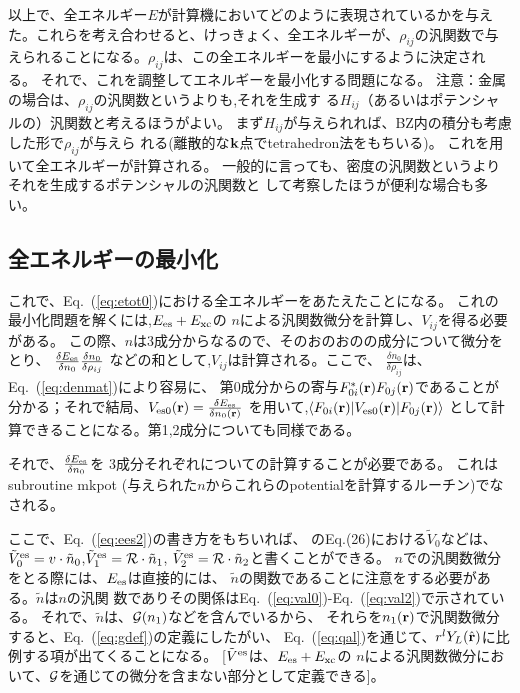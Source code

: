 \documentclass[a4paper,10pt,aip,onecolumn,amsmath,amssymb,floatfix,rmp]{revtex4-1}
\newcommand{\bfk}{{\bf k}}
\newcommand{\bfr}{{\bf r}}
\newcommand{\req}[1]{\mbox{Eq.~\!(\ref{#1})}}
\def\tn{\tilde{n}}
\def\tV{\tilde{V}}
\begin{document}
以上で、全エネルギー$E$が計算機においてどのように表現されているかを与え
た。これらを考え合わせると、けっきょく、全エネルギーが、$\rho_{ij}$の汎関数で与
えられることになる。$\rho_{ij}$は、この全エネルギーを最小にするように決定される。
それで、これを調整してエネルギーを最小化する問題になる。
{\small 注意：金属の場合は、$\rho_{ij}$の汎関数というよりも,それを生成す
る$H_{ij}$（あるいはポテンシャルの）汎関数と考えるほうがよい。
まず$H_{ij}$が与えられれば、BZ内の積分も考慮した形で$\rho_{ij}$が与えら
れる(離散的な$\bfk$点でtetrahedron法をもちいる)。
これを用いて全エネルギーが計算される。
一般的に言っても、密度の汎関数というよりそれを生成するポテンシャルの汎関数と
して考察したほうが便利な場合も多い。}

\subsection{全エネルギーの最小化}
これで、\req{eq:etot0}における全エネルギーをあたえたことになる。
これの最小化問題を解くには,$E_{\rm es} + E_{\rm xc}$の
$n$による汎関数微分を計算し、$V_{ij}$を得る必要がある。
この際、$n$は3成分からなるので、そのおのおのの成分について微分をとり、
$\frac{\delta E_{\rm es}}{\delta n_0} \frac{\delta n_0}{\delta\rho_{ij}}$
などの和として,$V_{ij}$は計算される。ここで、
$\frac{\delta n_0}{\delta \rho_{ij}}$は、\req{eq:denmat}により容易に、
第0成分からの寄与$F_{0i}^*(\bfr) F_{0j}(\bfr)$であることが
分かる；それで結局、$V_{\rm es0}(\bfr)=\frac{\delta E_{\rm es}}{\delta n_0(\bfr)}$
を用いて,$\langle F_{0i}(\bfr)|V_{\rm es0}(\bfr)| F_{0j}(\bfr)\rangle$
として計算できることになる。第1,2成分についても同様である。

それで、$\frac{\delta E_{\rm es}}{\delta n_0}$を
3成分それぞれについての計算することが必要である。
これはsubroutine mkpot
(与えられた$n$からこれらのpotentialを計算するルーチン)でなされる。

ここで、\req{eq:ees2}の書き方をもちいれば、
\cite{lmfchap}のEq.(26)における$\tV_0$などは、
$\tV^{\rm es}_0= v\cdot \tn_0$,$\tV^{\rm es}_1= {\cal R} \cdot\tn_1$,
$\tV^{\rm es}_2= {\cal R} \cdot \tn_2$と書くことができる。
$n$での汎関数微分をとる際には、$E_{\rm es}$は直接的には、
$\tn$の関数であることに注意をする必要がある。$\tn$は$n$の汎関
数でありその関係は\req{eq:val0}-\req{eq:val2}で示されている。
それで、$\tn$は、${\cal G}(n_1)$などを含んでいるから、
それらを$n_1(\bfr)$で汎関数微分すると、\req{eq:gdef}の定義にしたがい、
\req{eq:qal}を通じて、$r^l Y_L(\hat{\bfr})$に比例する項が出てくることになる。
[$\tV^{\rm es}$は、$E_{\rm es} + E_{\rm xc}$の
$n$による汎関数微分において、${\cal G}$を通じての微分を含まない部分として定義できる]。
\end{document}
